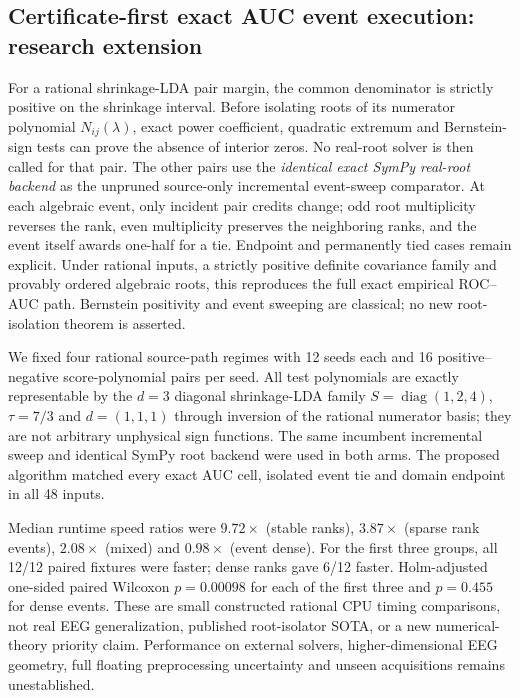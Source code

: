 \subsection{Certificate-first exact AUC event execution: research extension}
For a rational shrinkage-LDA pair margin, the common denominator
is strictly positive on the shrinkage interval. Before isolating
roots of its numerator polynomial $N_{ij}(\lambda)$, exact power
coefficient, quadratic extremum and Bernstein-sign tests can prove
the absence of interior zeros. No real-root solver is then called
for that pair. The other pairs use the \emph{identical exact
SymPy real-root backend} as the unpruned source-only incremental
event-sweep comparator. At each algebraic event, only incident
pair credits change; odd root multiplicity reverses the rank,
even multiplicity preserves the neighboring ranks, and the
event itself awards one-half for a tie. Endpoint and permanently
tied cases remain explicit. Under rational inputs, a strictly
positive definite covariance family and provably ordered
algebraic roots, this reproduces the full exact empirical
ROC--AUC path. Bernstein positivity and event sweeping are
classical; no new root-isolation theorem is asserted.

We fixed four rational source-path regimes with 12 seeds each
and 16 positive--negative score-polynomial pairs per seed.
All test polynomials are exactly representable by the
$d=3$ diagonal shrinkage-LDA family
$S=\operatorname{diag}(1,2,4)$, $\tau=7/3$ and
$d=(1,1,1)$ through inversion of the rational numerator
basis; they are not arbitrary unphysical sign functions.
The same incumbent incremental sweep and identical SymPy
root backend were used in both arms. The proposed
algorithm matched every exact AUC cell, isolated event
tie and domain endpoint in all 48 inputs.

Median runtime speed ratios were $9.72\times$ (stable ranks),
$3.87\times$ (sparse rank events), $2.08\times$ (mixed) and
$0.98\times$ (event dense). For the first three groups,
all 12/12 paired fixtures were faster; dense ranks gave
6/12 faster. Holm-adjusted one-sided paired Wilcoxon
$p=0.00098$ for each of the first three and
$p=0.455$ for dense events. These are small constructed
rational CPU timing comparisons, not real EEG
generalization, published root-isolator SOTA, or a
new numerical-theory priority claim. Performance on
external solvers, higher-dimensional EEG geometry,
full floating preprocessing uncertainty and unseen
acquisitions remains unestablished.
